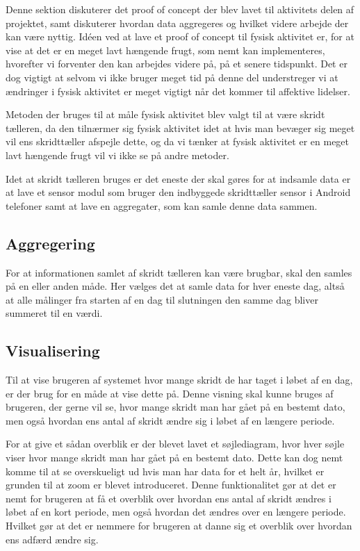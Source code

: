 Denne sektion diskuterer det proof of concept der blev lavet til aktivitets delen af projektet, samt diskuterer hvordan data aggregeres og hvilket videre arbejde der kan være nyttig. 
Idéen ved at lave et proof of concept til fysisk aktivitet er, for at vise at det er en meget lavt hængende frugt, som nemt kan implementeres, hvorefter vi forventer den kan arbejdes videre på, på et senere tidspunkt. 
Det er dog vigtigt at selvom vi ikke bruger meget tid på denne del understreger vi at ændringer i fysisk aktivitet er meget vigtigt når det kommer til affektive lidelser. 

Metoden der bruges til at måle fysisk aktivitet blev valgt til at være skridt tælleren, da den tilnærmer sig fysisk aktivitet idet at hvis man bevæger sig meget vil ens skridttæller afspejle dette, og da vi tænker at fysisk aktivitet er en meget lavt hængende frugt vil vi ikke se på andre metoder.

Idet at skridt tælleren bruges er det eneste der skal gøres for at indsamle data er at lave et sensor modul som bruger den indbyggede skridttæller sensor i Android telefoner samt at lave en aggregater, som kan samle denne data sammen. 

\subsection{Aggregering}
For at informationen samlet af skridt tælleren kan være brugbar, skal den samles på en eller anden måde.
Her vælges det at samle data for hver eneste dag, altså at alle målinger fra starten af en dag til slutningen den samme dag bliver summeret til en værdi.

\subsection{Visualisering}
Til at vise brugeren af systemet hvor mange skridt de har taget i løbet af en dag, er der brug for en måde at vise dette på.
Denne visning skal kunne bruges af brugeren, der gerne vil se, hvor mange skridt man har gået på en bestemt dato, men også hvordan ens antal af skridt ændre sig i løbet af en længere periode.

For at give et sådan overblik er der blevet lavet et søjlediagram, hvor hver søjle viser hvor mange skridt man har gået på en bestemt dato.
Dette kan dog nemt komme til at se overskueligt ud hvis man har data for et helt år, hvilket er grunden til at zoom er blevet introduceret.
Denne funktionalitet gør at det er nemt for brugeren at få et overblik over hvordan ens antal af skridt ændres i løbet af en kort periode, men også hvordan det ændres over en længere periode.
Hvilket gør at det er nemmere for brugeren at danne sig et overblik over hvordan ens adfærd ændre sig.

